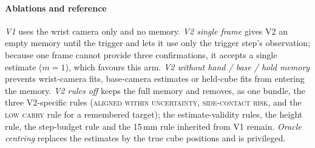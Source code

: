 \paragraph{Ablations and reference} \emph{V1} uses the wrist camera only and no memory. \emph{V2 single frame} gives V2 an empty memory until the trigger and lets it use only the trigger step's observation; because one frame cannot provide three confirmations, it accepts a single estimate ($m=1$), which favours this arm. \emph{V2 without hand / base / hold memory} prevents wrist-camera fits, base-camera estimates or held-cube fits from entering the memory. \emph{V2 rules off} keeps the full memory and removes, as one bundle, the three V2-specific rules (\textsc{aligned within uncertainty}, \textsc{side-contact risk}, and the \textsc{low carry} rule for a remembered target); the estimate-validity rules, the height rule, the step-budget rule and the 15\,mm rule inherited from V1 remain. \emph{Oracle centring} replaces the estimates by the true cube positions and is privileged.
